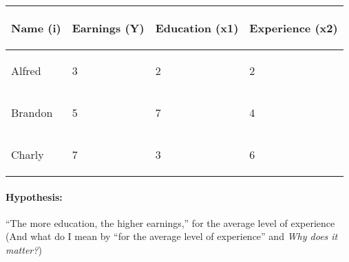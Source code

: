 \documentclass[10pt]{article}
\begin{document}
\begin{table}[!h]
        \centering
        
\begin{tabular}{|p{}|p{}|p{}|p{}|}
\hline 
 \begin{center}
\textbf{Name (i)}
\end{center}
 & \begin{center}
\textbf{Earnings (Y)}
\end{center}
 & \begin{center}
\textbf{Education (x1)}
\end{center}
 & \begin{center}
\textbf{Experience (x2)}
\end{center}
 \\
\hline 
 \begin{center}
Alfred
\end{center}
 & \begin{center}
3
\end{center}
 & \begin{center}
2
\end{center}
 & \begin{center}
2
\end{center}
 \\
\hline 
 \begin{center}
Brandon
\end{center}
 & \begin{center}
5
\end{center}
 & \begin{center}
7
\end{center}
 & \begin{center}
4
\end{center}
 \\
\hline 
 \begin{center}
Charly
\end{center}
 & \begin{center}
7
\end{center}
 & \begin{center}
3
\end{center}
 & \begin{center}
6
\end{center}
 \\
 \hline
\end{tabular}
        
        \end{table}


\paragraph{Hypothesis:} ``The more education, the higher earnings,'' for the  average level of experience (And what do I mean by ``for the  average level of experience'' and \emph{Why does it matter?}) 
\end{document}
